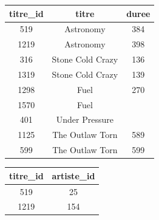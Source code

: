 \documentclass[article,a4paper,firamath,12pt]{nsi}
\begin{document}
\begin{center}
    \small
    \tabstyle[UGLiOrange]
    \begin{tabular}{|c|c|c|}
        \hline
        \rowcolor{UGLiOrange} \color{white}\textbf{titre\_id} & \color{white}\textbf{titre} & \color{white}\textbf{duree} \\
        \hline
        519                                                   & Astronomy                   & \color{white}384            \\
        \hline
        1219                                                  & Astronomy                   & \color{white}398            \\
        \hline
        316                                                   & Stone Cold Crazy            & 136                         \\
        \hline
        1319                                                  & Stone Cold Crazy            & 139                         \\
        \hline
        1298                                                  & \color{white}Fuel           & 270                         \\
        \hline
        1570                                                  & \color{white}Fuel           &                             \\
        \hline
        401                                                   & \color{white}Under Pressure &                             \\
        \hline
        1125                                                  & The Outlaw Torn             & 589                         \\
        \hline
        599                                                   & The Outlaw Torn             & 599                         \\
        \hline
    \end{tabular}\hspace*{1em}
    \begin{tabular}{|c|c|}
        \hline
        \rowcolor{UGLiOrange} \color{white}\textbf{titre\_id} & \color{white}\textbf{artiste\_id} \\
        \hline
        519                                                   & 25                                \\
        \hline
        1219                                                  & 154                               \\

\end{tabular}
\end{center}
\end{document}
